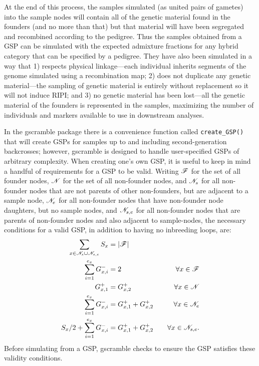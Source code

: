 At the end of this process, the samples simulated (as united pairs of gametes)
into the sample nodes will contain all of the genetic material found in the founders (and
no more than that)
but that material will have been segregated and recombined according to the pedigree.  Thus the
samples obtained from a GSP can be simulated with the expected admixture fractions
for any hybrid category that can be specified by a pedigree.  They have also been simulated
in a way that 1) respects physical linkage---each individual inherits segments of the genome
simulated using a recombination map; 2) does not duplicate any genetic material---the sampling of
genetic material is entirely without replacement so it will not induce RIPI; and 3) no genetic material has been lost---all the genetic material of the founders
is represented in the samples, maximizing the number of individuals and markers available to
use in downstream analyses.

In the gscramble package there is a convenience function called {\footnotesize\tt create\_GSP()} that
will create GSPs for samples up to and including second-generation backcrosses; however, gscramble is designed
to handle user-specified GSPs of arbitrary complexity.  When creating one's own GSP, it is useful
to keep in mind a handful of requirements for a GSP to be valid. Writing $\mathscr{F}$ for the set of all founder nodes, $\mathscr{N}$ for the set of all non-founder nodes, and $\mathscr{N}_s$ for all non-founder
nodes that are not parents of other non-founders, but are adjacent to a sample node, $\mathscr{N}_e$ for all
non-founder nodes that have non-founder node daughters, but no sample nodes, and $\mathscr{N}_{s,e}$ for all
non-founder nodes that are parents of non-founder nodes and also adjacent to sample-nodes, the necessary conditions 
for a valid GSP, in addition to having no inbreeding loops, are:
\begin{equation}
\begin{aligned}
\sum_{x \in \mathscr{N}_s \cup \mathscr{N}_{s,e}} S_x &= |\mathscr{F}| &  \\ 
\sum_{i=1}^{e_x} G^-_{x,i} &= 2 & \forall x \in \mathscr{F} \\
G^+_{x,1} &= G^+_{x,2} & \forall x \in \mathscr{N} \\
\sum_{i=1}^{e_x} G^-_{x,i} &= G^+_{x,1} +  G^+_{x,2} & \forall x \in \mathscr{N}_e  \\ 
 S_x/2 + \sum_{i=1}^{e_x} G^-_{x,i} &= G^+_{x,1} +  G^+_{x,2} & ~~~\forall x \in \mathscr{N}_{s,e}.  \\ 
\end{aligned}
\end{equation}
Before simulating from a GSP, gscramble checks to ensure the GSP
satisfies these validity conditions.


